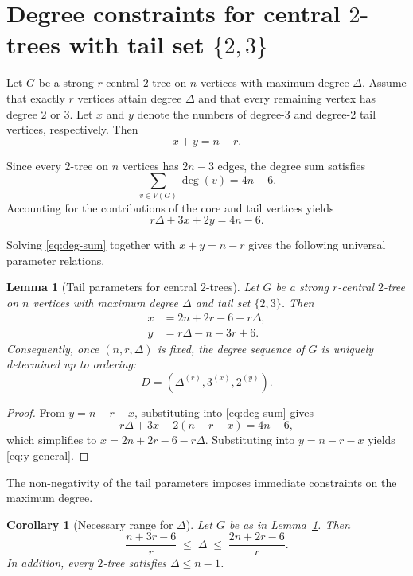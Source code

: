 \documentclass[12pt]{article}
\newtheorem{lemma}[theorem]{Lemma}
\newtheorem{corollary}[theorem]{Corollary}
\numberwithin{equation}{section}
\begin{document}
\section{Degree constraints for central $2$-trees with tail set $\{2,3\}$}

Let $G$ be a strong $r$-central $2$-tree on $n$ vertices with maximum degree $\Delta$.
Assume that exactly $r$ vertices attain degree $\Delta$ and that every remaining
vertex has degree $2$ or $3$.
Let $x$ and $y$ denote the numbers of degree-$3$ and degree-$2$ tail vertices,
respectively.
Then
\[
x+y=n-r.
\]

Since every $2$-tree on $n$ vertices has $2n-3$ edges, the degree sum satisfies
\[
\sum_{v\in V(G)} \deg(v) = 4n-6.
\]
Accounting for the contributions of the core and tail vertices yields
\begin{equation}\label{eq:deg-sum}
r\Delta + 3x + 2y = 4n-6.
\end{equation}

Solving \eqref{eq:deg-sum} together with $x+y=n-r$ gives the following universal
parameter relations.

\begin{lemma}[Tail parameters for central $2$-trees]
\label{lem:xy-general}
Let $G$ be a strong $r$-central $2$-tree on $n$ vertices with maximum degree $\Delta$
and tail set $\{2,3\}$.
Then
\begin{align}
x &= 2n + 2r - 6 - r\Delta, \label{eq:x-general}\\
y &= r\Delta - n - 3r + 6. \label{eq:y-general}
\end{align}
Consequently, once $(n,r,\Delta)$ is fixed, the degree sequence of $G$ is uniquely
determined up to ordering:
\[
D=(\Delta^{(r)},3^{(x)},2^{(y)}).
\]
\end{lemma}

\begin{proof}
From $y=n-r-x$, substituting into \eqref{eq:deg-sum} gives
\[
r\Delta + 3x + 2(n-r-x) = 4n-6,
\]
which simplifies to $x = 2n + 2r - 6 - r\Delta$.
Substituting into $y=n-r-x$ yields \eqref{eq:y-general}.
\end{proof}

The non-negativity of the tail parameters imposes immediate constraints on the maximum degree.

\begin{corollary}[Necessary range for $\Delta$]
\label{cor:delta-range-general}
Let $G$ be as in Lemma~\ref{lem:xy-general}. Then
\[
\frac{n+3r-6}{r}
\;\le\;
\Delta
\;\le\;
\frac{2n+2r-6}{r}.
\]
In addition, every $2$-tree satisfies $\Delta\le n-1$.
\end{corollary}
\end{document}
